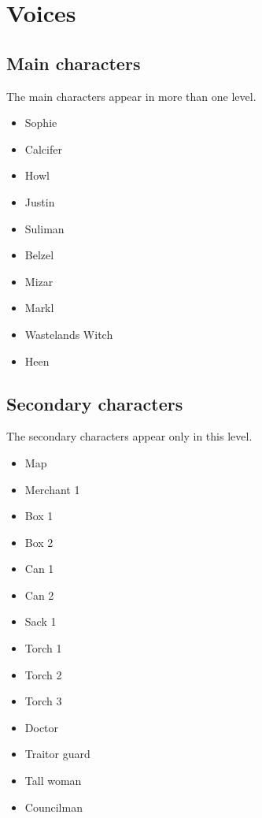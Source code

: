 \section{Voices}

\subsection{Main characters}
The main characters appear in more than one level.
\begin{itemize}
	\item Sophie
	\item Calcifer
	\item Howl
	\item Justin
	\item Suliman
	\item Belzel
	\item Mizar
	\item Markl
	\item Wastelands Witch
	\item Heen
\end{itemize}

\subsection{Secondary characters}
The secondary characters appear only in this level.
\begin{itemize}
	\item Map
	\item Merchant 1
	\item Box 1
	\item Box 2
	\item Can 1
	\item Can 2
	\item Sack 1
	\item Torch 1
	\item Torch 2
	\item Torch 3
	\item Doctor
	\item Traitor guard
	\item Tall woman
	\item Councilman
\end{itemize}

